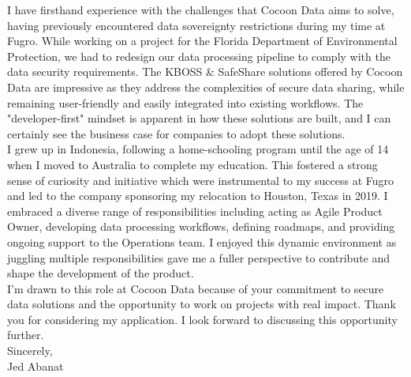 \documentclass[10pt,letterpaper]{article}
\begin{document}
I have firsthand experience with the challenges that Cocoon Data aims to solve, having previously encountered data sovereignty restrictions during my time at Fugro. While working on a project for the Florida Department of Environmental Protection, we had to redesign our data processing pipeline to comply with the data security requirements. The KBOSS \& SafeShare solutions offered by Cocoon Data are impressive as they address the complexities of secure data sharing, while remaining user-friendly and easily integrated into existing workflows. The "developer-first" mindset is apparent in how these solutions are built, and I can certainly see the business case for companies to adopt these solutions. \\

I grew up in Indonesia, following a home-schooling program until the age of 14 when I moved to Australia to complete my education. This fostered a strong sense of curiosity and initiative which were instrumental to my success at Fugro and led to the company sponsoring my relocation to Houston, Texas in 2019. I embraced a diverse range of responsibilities including acting as Agile Product Owner, developing data processing workflows, defining roadmaps, and providing ongoing support to the Operations team. I enjoyed this dynamic environment as juggling multiple responsibilities gave me a fuller perspective to contribute and shape the development of the product. \\

I’m drawn to this role at Cocoon Data because of your commitment to secure data solutions and the opportunity to work on projects with real impact. Thank you for considering my application. I look forward to discussing this opportunity further. \\

Sincerely,\\
Jed Abanat
\end{document}
